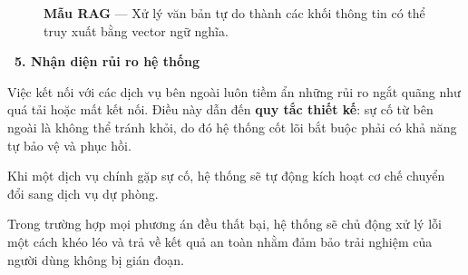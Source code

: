 \documentclass[12pt, a4paper]{article}
\begin{document}
\begin{figure}[H]
    \centering
    \caption{\textbf{Mẫu RAG} --- Xử lý văn bản tự do thành các khối thông tin có thể truy xuất bằng vector ngữ nghĩa.}
\end{figure}

\vspace{0.4cm}
\noindent\textcolor{red!80!black}{\textbf{\faExclamationTriangle \ 5. Nhận diện rủi ro hệ thống}}
\vspace{0.15cm}

\begin{tcolorbox}[blanker, borderline west={3pt}{0pt}{red!60!black}, left=12pt, top=2pt, bottom=2pt]
Việc kết nối với các dịch vụ bên ngoài luôn tiềm ẩn những rủi ro ngắt quãng như quá tải hoặc mất kết nối. Điều này dẫn đến \textbf{quy tắc thiết kế}: sự cố từ bên ngoài là không thể tránh khỏi, do đó hệ thống cốt lõi bắt buộc phải có khả năng tự bảo vệ và phục hồi.

\vspace{0.15cm}
\noindent Khi một dịch vụ chính gặp sự cố, hệ thống sẽ tự động kích hoạt cơ chế chuyển đổi sang dịch vụ dự phòng.

\vspace{0.15cm}
\noindent Trong trường hợp mọi phương án đều thất bại, hệ thống sẽ chủ động xử lý lỗi một cách khéo léo và trả về kết quả an toàn nhằm đảm bảo trải nghiệm của người dùng không bị gián đoạn.
\end{tcolorbox}
\end{document}
